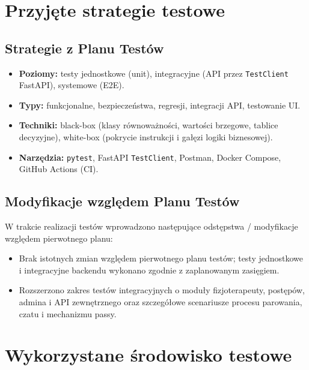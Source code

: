 \documentclass[11pt,a4paper]{article}
\begin{document}
\section{Przyjęte strategie testowe}

\subsection{Strategie z Planu Testów}
\begin{itemize}
  \item \textbf{Poziomy:} testy jednostkowe (unit), integracyjne (API przez \texttt{TestClient} FastAPI), systemowe (E2E).
  \item \textbf{Typy:} funkcjonalne, bezpieczeństwa, regresji, integracji API, testowanie UI.
  \item \textbf{Techniki:} black-box (klasy równoważności, wartości brzegowe, tablice decyzyjne), white-box (pokrycie instrukcji i gałęzi logiki biznesowej).
  \item \textbf{Narzędzia:} \texttt{pytest}, FastAPI \texttt{TestClient}, Postman, Docker Compose, GitHub Actions (CI).
\end{itemize}

\subsection{Modyfikacje względem Planu Testów}
W trakcie realizacji testów wprowadzono następujące odstępstwa / modyfikacje względem pierwotnego planu:
\begin{itemize}
  \item Brak istotnych zmian względem pierwotnego planu testów; testy jednostkowe i integracyjne backendu wykonano zgodnie z zaplanowanym zasięgiem.
  \item Rozszerzono zakres testów integracyjnych o moduły fizjoterapeuty, postępów, admina i API zewnętrznego oraz szczegółowe scenariusze procesu parowania, czatu i mechanizmu passy.
\end{itemize}

\section{Wykorzystane środowisko testowe}
\end{document}
